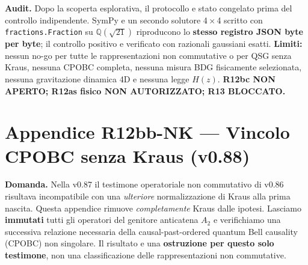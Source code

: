 \documentclass[11pt,a4paper]{article}
\begin{document}
\textbf{Audit.} Dopo la scoperta esplorativa, il protocollo e stato congelato prima del controllo indipendente. SymPy e un secondo solutore 4\,$\times$\,4 scritto con \texttt{fractions.Fraction} su $\mathbb Q(\sqrt{21})$ riproducono lo \textbf{stesso registro JSON byte per byte}; il controllo positivo e verificato con razionali gaussiani esatti. \textbf{Limiti:} nessun no-go per tutte le rappresentazioni non commutative o per QSG senza Kraus, nessuna CPOBC completa, nessuna misura BDG fisicamente selezionata, nessuna gravitazione dinamica 4D e nessuna legge $H(z)$. \textbf{R12bc NON APERTO; R12as fisico NON AUTORIZZATO; R13 BLOCCATO.}

\clearpage
\section*{Appendice R12bb-NK --- Vincolo CPOBC senza Kraus (v0.88)}
\textbf{Domanda.} Nella v0.87 il testimone operatoriale non commutativo di v0.86 risultava incompatibile con una \emph{ulteriore} normalizzazione di Kraus alla prima nascita. Questa appendice rimuove \emph{completamente} Kraus dalle ipotesi. Lasciamo \textbf{immutati} tutti gli operatori del genitore anticatena $A_2$ e verifichiamo una successiva relazione necessaria della causal-past-ordered quantum Bell causality (CPOBC) non singolare. Il risultato e una \textbf{ostruzione per questo solo testimone}, non una classificazione delle rappresentazioni non commutative.
\end{document}
